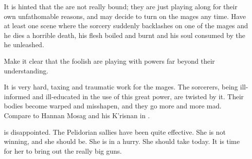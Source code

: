 It is hinted that the \daemons{} are not really bound; they are just playing along for their own unfathomable reasons, and may decide to turn on the mages any time. Have at least one scene where the sorcery suddenly backlashes on one of the mages and he dies a horrible death, his flesh boiled and burnt and his soul consumed by the \daemon{} he unleashed. 


Make it clear that the foolish \humans{} are playing with powers far beyond their understanding. 

It is very hard, taxing and traumatic work for the mages. The sorcerers, being ill-informed and ill-educated in the use of this great power, are twisted by it. Their bodies become warped and misshapen, and they go more and more mad. Compare to Hannan Mosag and his K'risnan in \cite{StevenEriksonIanCameronEsslemont:MalazanBookoftheFallen}.




\begin{comment}
  \subsection{Takestsha}
\end{comment}
\new
\Takestsha is disappointed. 
The Pelidorian sallies have been quite effective. 
She is not winning, and she should be.
She is in a hurry.
She should take \Forclin today. 
It is time for her to bring out the really big guns. 

